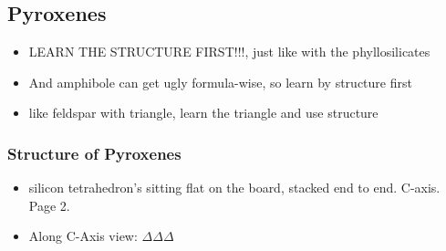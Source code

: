 \documentclass[11pt]{article}
\begin{document}
\subsection{Pyroxenes}
\label{sec-5-1}
\begin{itemize}
\item LEARN THE STRUCTURE FIRST!!!, just like with the phyllosilicates
\item And amphibole can get ugly formula-wise, so learn by structure first
\item like feldspar with triangle, learn the triangle and use structure
\end{itemize}
\subsubsection{Structure of Pyroxenes}
\label{sec-5-1-1}
\begin{itemize}
\item silicon tetrahedron's sitting flat on the board, stacked end to end. C-axis. Page 2.
\item Along C-Axis view: $\Delta$$\Delta$$\Delta$
\end{itemize}
\end{document}
